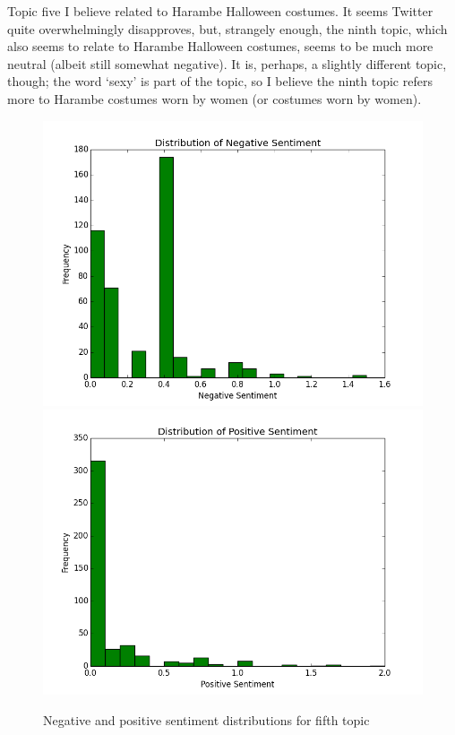 \documentclass{article}
\begin{document}
\begin{enumerate}
		Topic five I believe related to Harambe Halloween costumes. It seems Twitter quite overwhelmingly disapproves, but, strangely enough, the ninth topic, which also seems to relate to Harambe Halloween costumes, seems to be much more neutral (albeit still somewhat negative). It is, perhaps, a slightly different topic, though; the word `sexy' is part of the topic, so I believe the ninth topic refers more to Harambe costumes worn by women (or costumes worn by women).
		\begin{figure}[H]
			\includegraphics[scale=0.35]{4neg.png}
			\includegraphics[scale=0.35]{4pos.png}
			\begin{center}
			\caption{Negative and positive sentiment distributions for fifth topic}
			\end{center}
		\end{figure}
		

\end{enumerate}
\end{document}
